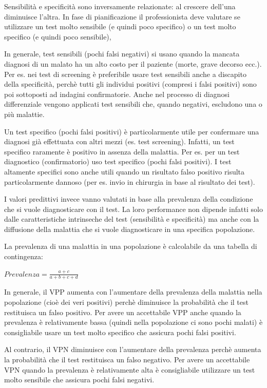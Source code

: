\documentclass[]{book}
\begin{document}
Sensibilità e specificità sono inversamente relazionate: al crescere dell'una diminuisce l'altra. In fase di pianificazione il professionista deve valutare se utilizzare un test molto sensibile (e quindi poco specifico) o un test molto specifico (e quindi poco sensibile),

In generale, test sensibili (pochi falsi negativi) si usano quando la mancata diagnosi di un malato ha un alto costo per il paziente (morte, grave decorso ecc.). Per es. nei test di screening è preferibile usare test sensibili anche a discapito della specificità, perchè tutti gli individui positivi (compresi i falsi positivi) sono poi sottoposti ad indagini confirmatorie. Anche nel processo di diagnosi differenziale vengono applicati test sensibili che, quando negativi, escludono una o più malattie.

Un test specifico (pochi falsi positivi) è particolarmente utile per confermare una diagnosi già effettuata con altri mezzi (es. test screening). Infatti, un test specifico raramente è positivo in assenza della malattia. Per es. per un test diagnostico (confirmatorio) uso test specifico (pochi falsi positivi). I test altamente specifici sono anche utili quando un risultato falso positivo risulta particolarmente dannoso (per es. invio in chirurgia in base al risultato dei test).

I valori predittivi invece vanno valutati in base alla prevalenza della condizione che si vuole diagnosticare con il test. La loro performance non dipende infatti solo dalle caratteristiche intrinseche del test (sensibilità e specificità) ma anche con la diffusione della malattia che si vuole diagnosticare in una specifica popolazione.

La prevalenza di una malattia in una popolazione è calcolabile da una tabella di contingenza:

\(Prevalenza = \frac {a+c}{a+b+c+d}\)

In generale, il VPP aumenta con l'aumentare della prevalenza della malattia nella popolazione (cioè dei veri positivi) perchè diminuisce la probabilità che il test restituisca un falso positivo. Per avere un accettabile VPP anche quando la prevalenza è relativamente bassa (quindi nella popolazione ci sono pochi malati) è consigliabile usare un test molto specifico che assicura pochi falsi positivi.

Al contrario, il VPN diminuisce con l'aumentare della prevalenza perchè aumenta la probabilità che il test restituisca un falso negativo. Per avere un accettabile VPN quando la prevalenza è relativamente alta è consigliabile utilizzare un test molto sensibile che assicura pochi falsi negativi.
\end{document}
